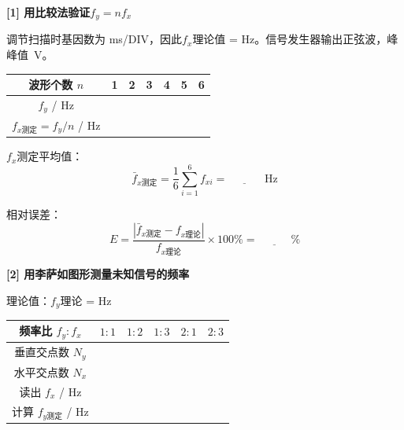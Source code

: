 \documentclass[a4paper,12pt]{article}
\begin{document}
{\fontsize{12pt}{18pt}\selectfont

\textbf{[1] 用比较法验证$f_y = nf_x$}

\vspace{0.2cm}

调节扫描时基因数为 \underline{\quad\quad} ms/DIV，因此$f_x$理论值 = \underline{\quad\quad} Hz。信号发生器输出正弦波，峰峰值 \underline{\quad\quad}\,V。

\vspace{0.3cm}

{\fontsize{10pt}{14pt}\selectfont
\begin{tabular}{c|c|c|c|c|c|c}
    \toprule
    波形个数 $n$ & 1 & 2 & 3 & 4 & 5 & 6 \\
    \midrule
    $f_y$ / Hz & & & & & & \\[0.5em]
    $f_{x\text{测定}} = f_y / n$ / Hz & & & & & & \\[0.5em]
    \bottomrule
\end{tabular}
}

\vspace{0.3cm}

$f_x$测定平均值：
\[
\bar{f}_{x\text{测定}} = \frac{1}{6}\sum_{i=1}^{6} f_{xi} = \underline{\quad\quad\quad} \text{ Hz}
\]

相对误差：
\[
E = \frac{|\bar{f}_{x\text{测定}} - f_{x\text{理论}}|}{f_{x\text{理论}}} \times 100\% = \underline{\quad\quad\quad}\%
\]

\vspace{0.5cm}

\textbf{[2] 用李萨如图形测量未知信号的频率}

\vspace{0.2cm}

理论值：$f_y$理论 = \underline{\quad\quad} Hz

\vspace{0.3cm}

{\fontsize{10pt}{14pt}\selectfont
\begin{tabular}{c|c|c|c|c|c}
    \toprule
    频率比 $f_y : f_x$ & $1:1$ & $1:2$ & $1:3$ & $2:1$ & $2:3$ \\
    \midrule
    垂直交点数 $N_y$ & & & & & \\[0.5em]
    水平交点数 $N_x$ & & & & & \\[0.5em]
    读出 $f_x$ / Hz & & & & & \\[0.5em]
    计算 $f_{y\text{测定}}$ / Hz & & & & & \\[0.5em]
    \bottomrule
\end{tabular}
}

}
\end{document}
